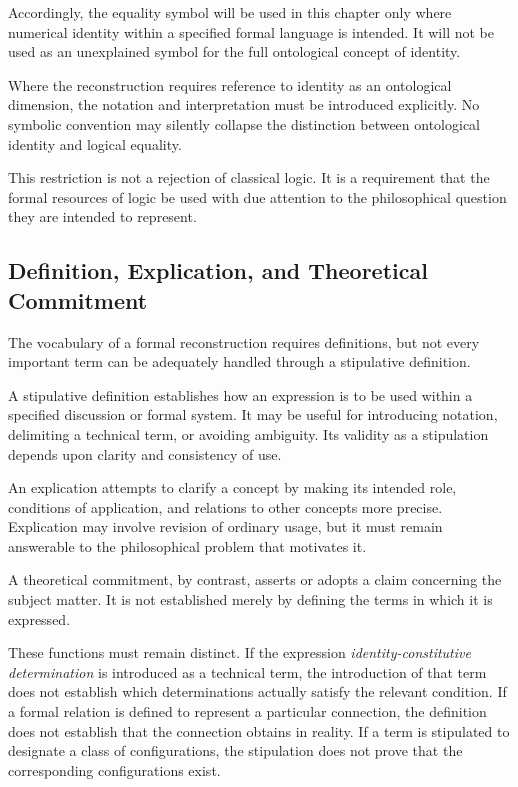 Accordingly, the equality symbol will be used
in this chapter only where numerical identity
within a specified formal language is intended.
It will not be used as an unexplained symbol
for the full ontological concept of identity.

Where the reconstruction requires reference
to identity as an ontological dimension, the
notation and interpretation must be introduced
explicitly. No symbolic convention may silently
collapse the distinction between ontological
identity and logical equality.

This restriction is not a rejection of classical
logic. It is a requirement that the formal
resources of logic be used with due attention
to the philosophical question they are intended
to represent.

\subsection{Definition, Explication, and Theoretical Commitment}

The vocabulary of a formal reconstruction
requires definitions, but not every important
term can be adequately handled through a
stipulative definition.

A stipulative definition establishes how an
expression is to be used within a specified
discussion or formal system. It may be useful
for introducing notation, delimiting a technical
term, or avoiding ambiguity. Its validity
as a stipulation depends upon clarity and
consistency of use.

An explication attempts to clarify a concept
by making its intended role, conditions of
application, and relations to other concepts
more precise. Explication may involve revision
of ordinary usage, but it must remain answerable
to the philosophical problem that motivates it.

A theoretical commitment, by contrast, asserts
or adopts a claim concerning the subject matter.
It is not established merely by defining the
terms in which it is expressed.

These functions must remain distinct. If the
expression \emph{identity-constitutive determination}
is introduced as a technical term, the
introduction of that term does not establish
which determinations actually satisfy the
relevant condition. If a formal relation is
defined to represent a particular connection,
the definition does not establish that the
connection obtains in reality. If a term is
stipulated to designate a class of configurations,
the stipulation does not prove that the
corresponding configurations exist.

